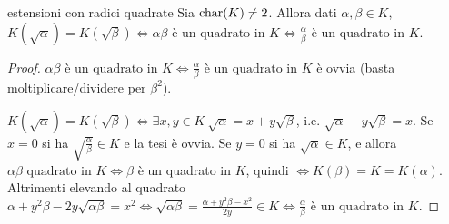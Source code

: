 \begin{theorem}{estensioni con radici quadrate}
    Sia $\text{char}(K) \neq 2$. Allora dati $\alpha, \beta \in K$, $K(\sqrt{\alpha}) = K(\sqrt{\beta}) \iff \alpha\beta \text{ è un quadrato in } K \iff \frac{\alpha}{\beta} \text{ è un quadrato in } K$.
\end{theorem}
\begin{proof}
    $\alpha\beta \text{ è un quadrato in } K \iff \frac{\alpha}{\beta} \text{ è un quadrato in } K$ è ovvia (basta moltiplicare/dividere per $\beta^2$).
    
    $K(\sqrt{\alpha}) = K(\sqrt{\beta}) \iff \exists x,y \in K \ \sqrt{\alpha} = x+y \sqrt{\beta}$, i.e. $\sqrt{\alpha} - y \sqrt{\beta} = x$. Se $x=0$ si ha $\sqrt{\frac{\alpha}{\beta}} \in K$ e la tesi è ovvia. Se $y=0$ si ha $\sqrt{\alpha} \in K$, e allora $\alpha\beta \text{ quadrato in } K \iff  \beta$ è un quadrato in $K$, quindi $\iff K(\beta) = K = K(\alpha)$. Altrimenti elevando al quadrato
    $\alpha + y^2 \beta - 2y\sqrt{\alpha \beta} = x^2 \iff \sqrt{\alpha\beta} = \frac{\alpha + y^2\beta - x^2}{2y} \in K \iff \frac{\alpha}{\beta} \text{ è un quadrato in } K$. 
\end{proof}

